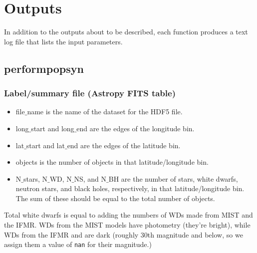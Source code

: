 \documentclass{scrartcl}
\def\tus{\textunderscore}
\begin{document}
\newpage

\section{Outputs}

In addition to the outputs about to be described, each function produces a text log file that lists the input parameters.

\subsection{perform\tus pop\tus syn}

\subsubsection{Label/summary file (Astropy FITS table)}

\begin{itemize}
    \item file$\_$name is the name of the dataset for the HDF5 file.
    
    \item long$\_$start and long$\_$end are the edges of the longitude bin.
    
    \item lat$\_$start and lat$\_$end are the edges of the latitude bin.
    
    \item objects is the number of objects in that latitude/longitude bin.
    
    \item N$\_$stars, N$\_$WD, N$\_$NS, and N$\_$BH are the number of stars, white dwarfs, neutron stars, and black holes, respectively, in that latitude/longitude bin. 
    The sum of these should be equal to the total number of objects.
\end{itemize}
Total white dwarfs is equal to adding the numbers of WDs made from MIST and the IFMR. 
WDs from the MIST models have photometry (they're bright), while WDs from the IFMR and are dark (roughly 30th magnitude and below, so we assign them a value of \texttt{nan} for their magnitude.)
\end{document}
